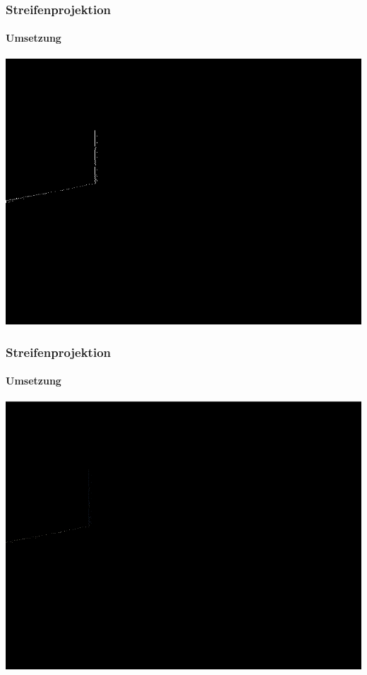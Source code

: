 \documentclass[xcolor=dvipsnames]{beamer}
\begin{document}
\begin{frame}
	\frametitle{Streifenprojektion}
	\framesubtitle{Umsetzung}

	
	\includegraphics[width=0.9\linewidth]{includes/line.png}

\end{frame}
\begin{frame}
	\frametitle{Streifenprojektion}
	\framesubtitle{Umsetzung}

	
	\includegraphics[width=0.9\linewidth]{includes/3d.png}

\end{frame}
\end{document}
